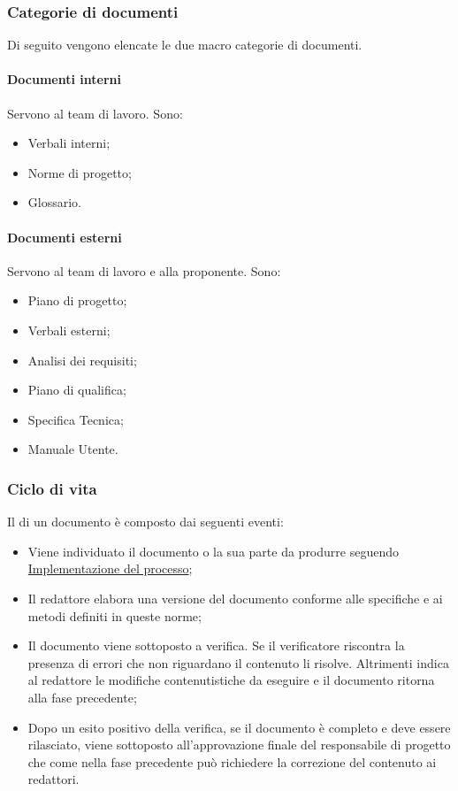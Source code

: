 \subsubsection{Categorie di documenti}
Di seguito vengono elencate le due macro categorie di documenti. 

\paragraph{Documenti interni}
Servono al team di lavoro.
Sono:
\begin{itemize}
    \item Verbali interni;
    \item Norme di progetto;
    \item Glossario.
\end{itemize}

\paragraph{Documenti esterni}
Servono al team di lavoro e alla proponente.
Sono:
\begin{itemize}
    \item Piano di progetto;
    \item Verbali esterni;
    \item Analisi dei requisiti;
    \item Piano di qualifica;
    \item Specifica Tecnica;
    \item Manuale Utente.
\end{itemize}

\subsubsection{Ciclo di vita}
Il  di un documento è composto dai seguenti eventi:
\begin{itemize}
    \item Viene individuato il documento o la sua parte da produrre seguendo \hyperref[subsubsec:implementazione_processo]{Implementazione del processo}; 
    \item Il redattore elabora una versione del documento conforme alle specifiche e ai metodi definiti in queste norme;
    \item Il documento viene sottoposto a verifica. Se il verificatore riscontra la presenza di errori che non riguardano il contenuto li risolve.
    Altrimenti indica al redattore le modifiche contenutistiche da eseguire e il documento ritorna alla fase precedente;
    \item Dopo un esito positivo della verifica, se il documento è completo e deve essere rilasciato, viene sottoposto all'approvazione finale del responsabile di progetto che come nella fase precedente può richiedere la correzione del contenuto ai redattori.
\end{itemize}

